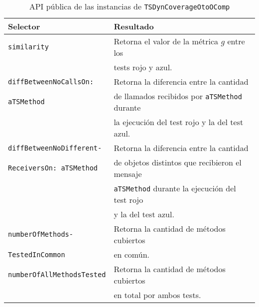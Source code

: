 \begin{table}[h] 
    \centering 
    \begin{tabular}{|l|l|}
    	\hline
\textbf{Selector} & \textbf{Resultado} \\ \hline \hline

{\tt similarity } & Retorna el valor de la métrica $g$ entre los \\
				 & tests rojo y azul. \\ \hline	
{\tt diffBetweenNoCallsOn:} & Retorna la diferencia entre la cantidad \\ 
{\tt  aTSMethod}		& de llamados recibidos por {\tt aTSMethod} durante  \\ 
						& la ejecución del test rojo y la del test azul.\\ \hline
{\tt diffBetweenNoDifferent-}	& Retorna la diferencia entre la cantidad \\ 
{\tt ReceiversOn: aTSMethod } &  de objetos distintos que recibieron el mensaje  \\
						& {\tt aTSMethod} durante la ejecución del test rojo \\
						& y la del test azul.\\ \hline
{\tt numberOfMethods- } & Retorna la cantidad de métodos cubiertos\\
{\tt TestedInCommon}						&  en común.\\ \hline
{\tt numberOfAllMethodsTested} & Retorna la cantidad de métodos cubiertos \\
						& en total por ambos tests. \\ \hline		
				
    \end{tabular}
    \caption{API pública de las instancias de {\tt TSDynCoverageOtoOComp}}
\end{table} 

\vspace*{1cm}

